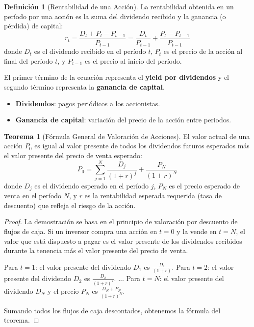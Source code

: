 \documentclass[12pt,a4paper]{article}
\theoremstyle{definition}
\newtheorem{definicion}{Definición}[section]
\newtheorem{teorema}{Teorema}[section]
\begin{document}
\begin{definicion}[Rentabilidad de una Acción]
La rentabilidad obtenida en un período por una acción es la suma del dividendo recibido y la ganancia (o pérdida) de capital:
\begin{equation}
r_t = \frac{D_t + P_t - P_{t-1}}{P_{t-1}} = \frac{D_t}{P_{t-1}} + \frac{P_t - P_{t-1}}{P_{t-1}}
\end{equation}
donde $D_t$ es el dividendo recibido en el período $t$, $P_t$ es el precio de la acción al final del período $t$, y $P_{t-1}$ es el precio al inicio del período.
\end{definicion}

El primer término de la ecuación representa el \textbf{yield por dividendos} y el segundo término representa la \textbf{ganancia de capital}.

\begin{itemize}[leftmargin=*, topsep=2pt]
\item \textbf{Dividendos}: pagos periódicos a los accionistas.
\item \textbf{Ganancia de capital}: variación del precio de la acción entre periodos.
\end{itemize}

\begin{teorema}[Fórmula General de Valoración de Acciones]
El valor actual de una acción $P_0$ es igual al valor presente de todos los dividendos futuros esperados más el valor presente del precio de venta esperado:
\begin{equation}
P_0 = \sum_{j=1}^{N} \frac{D_j}{(1+r)^j} + \frac{P_N}{(1+r)^N}
\end{equation}
donde $D_j$ es el dividendo esperado en el período $j$, $P_N$ es el precio esperado de venta en el período $N$, y $r$ es la rentabilidad esperada requerida (tasa de descuento) que refleja el riesgo de la acción.
\end{teorema}

\begin{proof}
La demostración se basa en el principio de valoración por descuento de flujos de caja. Si un inversor compra una acción en $t=0$ y la vende en $t=N$, el valor que está dispuesto a pagar es el valor presente de los dividendos recibidos durante la tenencia más el valor presente del precio de venta.

Para $t=1$: el valor presente del dividendo $D_1$ es $\frac{D_1}{(1+r)}$.
Para $t=2$: el valor presente del dividendo $D_2$ es $\frac{D_2}{(1+r)^2}$.
...
Para $t=N$: el valor presente del dividendo $D_N$ y el precio $P_N$ es $\frac{D_N + P_N}{(1+r)^N}$.

Sumando todos los flujos de caja descontados, obtenemos la fórmula del teorema.
\end{proof}
\end{document}
